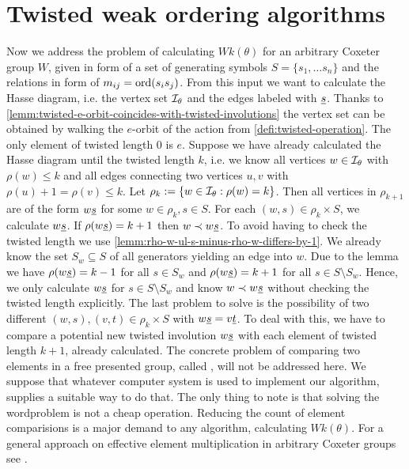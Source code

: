 \section{Twisted weak ordering algorithms}
\label{sec:twisted-involutions-algorithms}

Now we address the problem of calculating $Wk(\theta)$ for an arbitrary Coxeter group $W$, given in form of a set of generating symbols $S = \{s_1, \ldots s_n\}$ and the relations in form of $m_{ij} = \operatorname{ord}(s_i s_j)$. From this input we want to calculate the Hasse diagram, i.e. the vertex set $\mathcal{I}_{\theta}$ and the edges labeled with $\underline{s}$. Thanks to \ref{lemm:twisted-e-orbit-coincides-with-twisted-involutions} the vertex set can be obtained by walking the $e$-orbit of the action from \ref{defi:twisted-operation}. The only element of twisted length 0 is $e$. Suppose we have already calculated the Hasse diagram until the twisted length $k$, i.e. we know all vertices $w \in \mathcal{I}_{\theta}$ with $\rho(w) \leq k$ and all edges connecting two vertices $u,v$ with $\rho(u) + 1 = \rho(v) \leq k$. Let $\rho_k := \{ w \in \mathcal{I}_{\theta} : \rho(w) = k \}$. Then all vertices in $\rho_{k+1}$ are of the form $w \underline{s}$ for some $w \in \rho_k, s \in S$. For each $(w,s) \in \rho_k \times S$, we calculate $w \underline{s}$. If $\rho(w \underline{s}) = k + 1$ then $w \prec w \underline{s}$. To avoid having to check the twisted length we use \ref{lemm:rho-w-ul-s-minus-rho-w-differs-by-1}. We already know the set $S_w \subseteq S$ of all generators yielding an edge into $w$. Due to the lemma we have $\rho(w \underline{s}) = k - 1$ for all $s \in S_w$ and $\rho(w \underline{s}) = k + 1$ for all $s \in S \setminus S_w$. Hence, we only calculate $w \underline{s}$ for $s \in S \setminus S_w$ and know $w \prec w \underline{s}$ without checking the twisted length explicitly. The last problem to solve is the possibility of two different $(w,s),(v,t) \in \rho_k \times S$ with $w \underline{s} = v \underline{t}$. To deal with this, we have to compare a potential new twisted involution $w \underline{s}$ with each element of twisted length $k+1$, already calculated. The concrete problem of comparing two elements in a free presented group, called , will not be addressed here. We suppose that whatever computer system is used to implement our algorithm, supplies a suitable way to do that. The only thing to note is that solving the wordproblem is not a cheap operation. Reducing the count of element comparisions is a major demand to any algorithm, calculating $Wk(\theta)$. For a general approach on effective element multiplication in arbitrary Coxeter groups see \cite{casselman:coxeter-multiplication-i,casselman:coxeter-multiplication-ii}.

